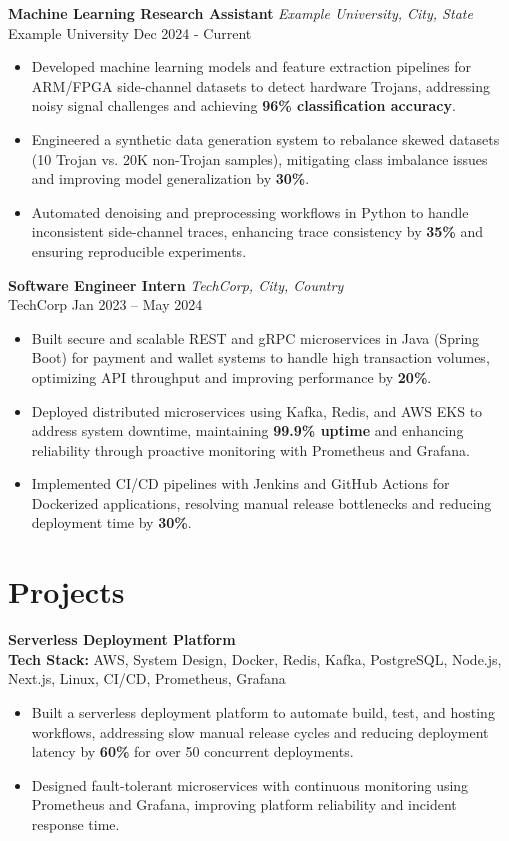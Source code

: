 \documentclass[letterpaper,10.5pt]{article}
\begin{document}
\textbf{Machine Learning Research Assistant} \hfill \textit{Example University, City, State}\\[-2pt]
Example University \hfill Dec 2024 - Current
\begin{itemize}\itemsep 1pt
  \item Developed machine learning models and feature extraction pipelines for ARM/FPGA side-channel datasets to detect hardware Trojans, addressing noisy signal challenges and achieving \textbf{96\% classification accuracy}.
  \item Engineered a synthetic data generation system to rebalance skewed datasets (10 Trojan vs. 20K non-Trojan samples), mitigating class imbalance issues and improving model generalization by \textbf{30\%}.
  \item Automated denoising and preprocessing workflows in Python to handle inconsistent side-channel traces, enhancing trace consistency by \textbf{35\%} and ensuring reproducible experiments.
\end{itemize}

\textbf{Software Engineer Intern} \hfill \textit{TechCorp, City, Country}\\[-2pt]
TechCorp \hfill Jan 2023 -- May 2024
\begin{itemize}\itemsep 1pt
  \item Built secure and scalable REST and gRPC microservices in Java (Spring Boot) for payment and wallet systems to handle high transaction volumes, optimizing API throughput and improving performance by \textbf{20\%}.
  \item Deployed distributed microservices using Kafka, Redis, and AWS EKS to address system downtime, maintaining \textbf{99.9\% uptime} and enhancing reliability through proactive monitoring with Prometheus and Grafana.
  \item Implemented CI/CD pipelines with Jenkins and GitHub Actions for Dockerized applications, resolving manual release bottlenecks and reducing deployment time by \textbf{30\%}.
\end{itemize}

\section{Projects}

\textbf{Serverless Deployment Platform} \hfill \\
\textbf{Tech Stack:} AWS, System Design, Docker, Redis, Kafka, PostgreSQL, Node.js, Next.js, Linux, CI/CD, Prometheus, Grafana
\begin{itemize}\itemsep 1pt
  \item Built a serverless deployment platform to automate build, test, and hosting workflows, addressing slow manual release cycles and reducing deployment latency by \textbf{60\%} for over 50 concurrent deployments.
  \item Designed fault-tolerant microservices with continuous monitoring using Prometheus and Grafana, improving platform reliability and incident response time.
\end{itemize}
\end{document}
